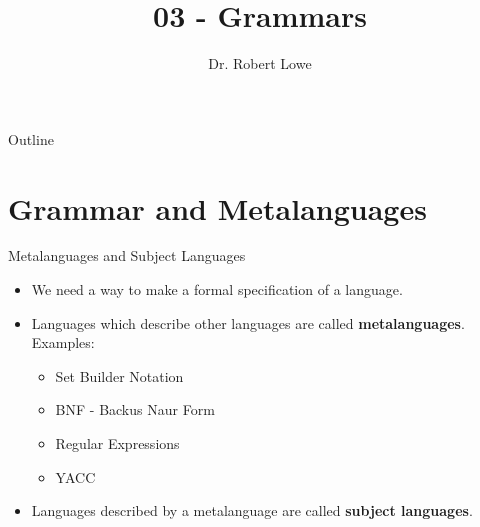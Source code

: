 \documentclass{beamer}
\title{03 - Grammars}
\author{Dr. Robert Lowe\\}
\institute[Maryville College] %
{
  Division of Mathematics and Computer Science\\
  Maryville College
}
\date[]{}
\begin{document}
\begin{frame}
  \titlepage
\end{frame}

\begin{frame}{Outline}
  \tableofcontents
\end{frame}





\section{Grammar and Metalanguages}

\begin{frame}{Metalanguages and Subject Languages}
    \begin{itemize}[<+(1)->]
        \item We need a way to make a formal specification of
            a language.
        \item Languages which describe other languages are called
            \textbf{metalanguages}. Examples:
            \begin{itemize}
                \item Set Builder Notation
                \item BNF - Backus Naur Form
                \item Regular Expressions
                \item YACC
            \end{itemize}
        \item Languages described by a metalanguage are called
            \textbf{subject languages}.
    \end{itemize}
\end{frame}
\end{document}
